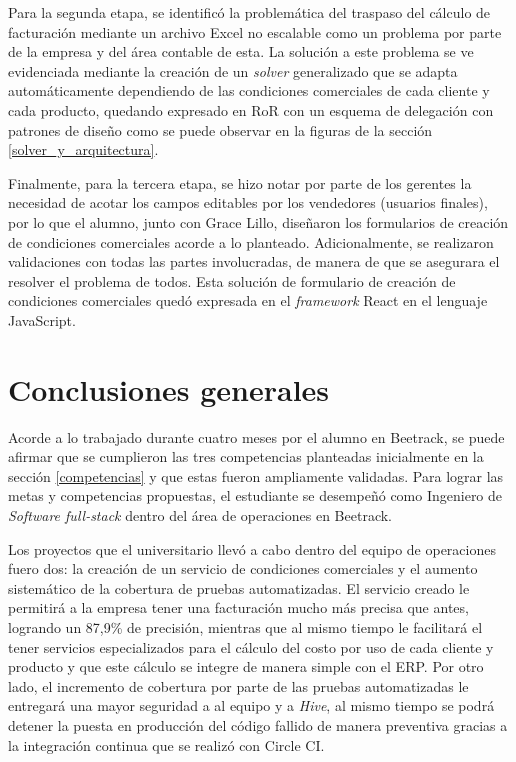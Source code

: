 \begin{enumerate}
    Para la segunda etapa, se identificó la problemática del traspaso del cálculo de facturación mediante un archivo Excel no escalable como un problema por parte de la empresa y del área contable de esta. La solución a este problema se ve evidenciada mediante la creación de un \textit{solver} generalizado que se adapta automáticamente dependiendo de las condiciones comerciales de cada cliente y cada producto, quedando expresado en RoR con un esquema de delegación con patrones de diseño como se puede observar en la figuras de la sección \ref{solver_y_arquitectura}.

    Finalmente, para la tercera etapa, se hizo notar por parte de los gerentes la necesidad de acotar los campos editables por los vendedores (usuarios finales), por lo que el alumno, junto con Grace Lillo, diseñaron los formularios de creación de condiciones comerciales acorde a lo planteado. Adicionalmente, se realizaron validaciones con todas las partes involucradas, de manera de que se asegurara el resolver el problema de todos. Esta solución de formulario de creación de condiciones comerciales quedó expresada en el \textit{framework} React en el lenguaje JavaScript.

  \end{enumerate}

\section{Conclusiones generales}

  Acorde a lo trabajado durante cuatro meses por el alumno en Beetrack, se puede afirmar que se cumplieron las tres competencias planteadas inicialmente en la sección \ref{competencias} y que estas fueron ampliamente validadas. Para lograr las metas y competencias propuestas, el estudiante se desempeñó como Ingeniero de \textit{Software full-stack} dentro del área de operaciones en Beetrack.
  
  Los proyectos que el universitario llevó a cabo dentro del equipo de operaciones fuero dos: la creación de un servicio de condiciones comerciales  y el aumento sistemático de la cobertura de pruebas automatizadas. El servicio creado le permitirá a la empresa tener una facturación mucho más precisa que antes, logrando un 87,9\% de precisión, mientras que al mismo tiempo le facilitará el tener servicios especializados para el cálculo del costo por uso de cada cliente y producto y que este cálculo se integre de manera simple con el ERP. Por otro lado, el incremento de cobertura por parte de las pruebas automatizadas le entregará una mayor seguridad a al equipo y a \textit{Hive}, al mismo tiempo se podrá detener la puesta en producción del código fallido de manera preventiva gracias a la integración continua que se realizó con Circle CI.

